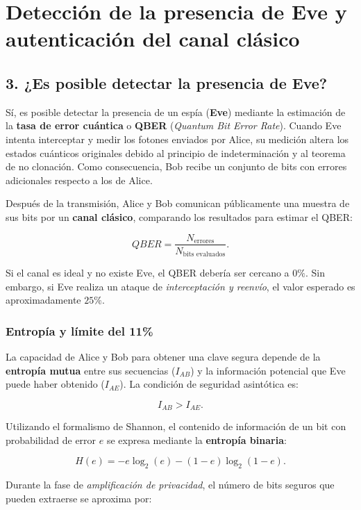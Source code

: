 \documentclass[12pt]{article}
\begin{document}
\section{Detección de la presencia de Eve y autenticación del canal clásico}

\subsection*{3. ¿Es posible detectar la presencia de Eve?}

Sí, es posible detectar la presencia de un espía (\textbf{Eve}) mediante la estimación de la 
\textbf{tasa de error cuántica} o \textbf{QBER} (\textit{Quantum Bit Error Rate}). 
Cuando Eve intenta interceptar y medir los fotones enviados por Alice, 
su medición altera los estados cuánticos originales debido al principio de indeterminación 
y al teorema de no clonación. Como consecuencia, Bob recibe un conjunto de bits con 
errores adicionales respecto a los de Alice.

Después de la transmisión, Alice y Bob comunican públicamente una muestra de sus bits 
por un \textbf{canal clásico}, comparando los resultados para estimar el QBER:

\[
QBER = \frac{N_{\text{errores}}}{N_{\text{bits\ evaluados}}}.
\]

Si el canal es ideal y no existe Eve, el QBER debería ser cercano a $0\%$.  
Sin embargo, si Eve realiza un ataque de \textit{interceptación y reenvío}, 
el valor esperado es aproximadamente $25\%$.

\subsubsection*{Entropía y límite del 11\%}

La capacidad de Alice y Bob para obtener una clave segura depende de la 
\textbf{entropía mutua} entre sus secuencias ($I_{AB}$) y la información potencial 
que Eve puede haber obtenido ($I_{AE}$).  
La condición de seguridad asintótica es:

\[
I_{AB} > I_{AE}.
\]

Utilizando el formalismo de Shannon, el contenido de información de un bit con 
probabilidad de error $e$ se expresa mediante la \textbf{entropía binaria}:

\[
H(e) = -e \log_2(e) - (1-e)\log_2(1-e).
\]

Durante la fase de \textit{amplificación de privacidad}, el número de bits seguros que pueden 
extraerse se aproxima por:
\end{document}
